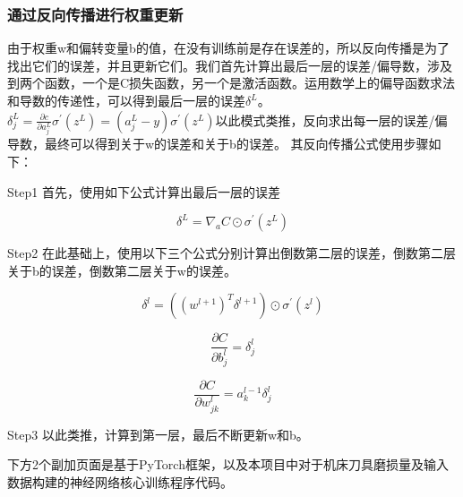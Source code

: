 \subsubsection{通过反向传播进行权重更新}
由于权重w和偏转变量b的值，在没有训练前是存在误差的，所以反向传播是为了找出它们的误差，并且更新它们。我们首先计算出最后一层的误差/偏导数，涉及到两个函数，一个是C损失函数，另一个是激活函数。运用数学上的偏导函数求法和导数的传递性，可以得到最后一层的误差$ \delta^{L}$。$ \delta_{j}^{L}=\frac{\partial c}{\partial a_{j}^{L}} \sigma^{\prime}\left(z^{L}\right)=\left(a_{j}^{L}-y\right) \sigma^{\prime}\left(z^{L}\right) $以此模式类推，反向求出每一层的误差/偏导数，最终可以得到关于w的误差和关于b的误差。
其反向传播公式使用步骤如下：\par
Step1 首先，使用如下公式计算出最后一层的误差\par
$$ \delta^{L}=\nabla_{a} C \odot \sigma^{\prime}\left(z^{L}\right) $$ \par
Step2 在此基础上，使用以下三个公式分别计算出倒数第二层的误差，倒数第二层关于b的误差，倒数第二层关于w的误差。\par
$$ \delta^{l}=\left(\left(w^{l+1}\right)^{T} \delta^{l+1}\right) \odot \sigma^{\prime}\left(z^{l}\right) $$ \par
$$ \frac{\partial C}{\partial b_{j}^{l}}=\delta_{j}^{l} $$ \par
$$ \frac{\partial C}{\partial w_{j k}^{l}}=a_{k}^{l-1} \delta_{j}^{l} $$ \par
% 
Step3 以此类推，计算到第一层，最后不断更新w和b。 \par
下方2个副加页面是基于PyTorch框架，以及本项目中对于机床刀具磨损量及输入数据构建的神经网络核心训练程序代码。
% 
% 
% 

% 